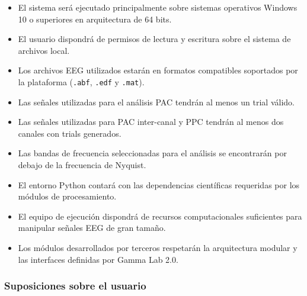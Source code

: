 \documentclass[12pt, letterpaper]{article}
\begin{document}
\begin{itemize}

\item El sistema será ejecutado principalmente sobre sistemas operativos
Windows 10 o superiores en arquitectura de 64 bits.

\item El usuario dispondrá de permisos de lectura y escritura sobre el
sistema de archivos local.

\item Los archivos EEG utilizados estarán en formatos compatibles soportados
por la plataforma (\texttt{.abf}, \texttt{.edf} y \texttt{.mat}).

\item Las señales utilizadas para el análisis PAC tendrán al menos un trial
válido.

\item Las señales utilizadas para PAC inter-canal y PPC tendrán al menos dos
canales con trials generados.

\item Las bandas de frecuencia seleccionadas para el análisis se encontrarán
por debajo de la frecuencia de Nyquist.

\item El entorno Python contará con las dependencias científicas requeridas
por los módulos de procesamiento.

\item El equipo de ejecución dispondrá de recursos computacionales suficientes
para manipular señales EEG de gran tamaño.

\item Los módulos desarrollados por terceros respetarán la arquitectura
modular y las interfaces definidas por Gamma Lab 2.0.

\end{itemize}

\subsubsection{Suposiciones sobre el usuario}
\end{document}
